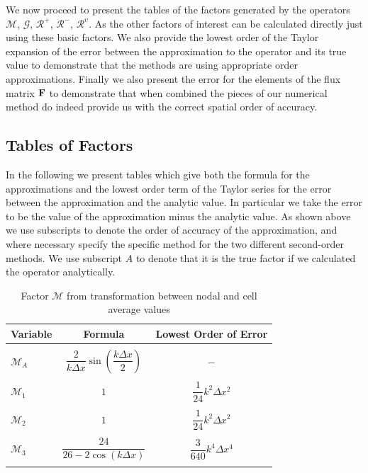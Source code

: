We now proceed to present the tables of the factors generated by the operators $\mathcal{M}$, $\mathcal{G}$, $\mathcal{R}^+$, $\mathcal{R}^-$, $\mathcal{R}^{\upsilon}$. As the other factors of interest can be calculated directly just using these basic factors. We also provide the lowest order of the Taylor expansion of the error between the approximation to the operator and its true value to demonstrate that the methods are using appropriate order approximations. Finally we also present the error for the elements of the flux matrix $\mathbf{F}$ to demonstrate that when combined the pieces of our numerical method do indeed provide us with the correct spatial order of accuracy.

\subsection{Tables of Factors}
In the following we present tables which give both the formula for the approximations and the lowest order term of the Taylor series for the error between the approximation and the analytic value. In particular we take the error to be the value of the approximation minus the analytic value. As shown above we use subscripts to denote the order of accuracy of the approximation, and where necessary specify the specific method for the two different second-order methods. We use subscript $A$ to denote that it is the true factor if we calculated the operator analytically.
\begin{table}
	\centering
	\begin{tabular}{l  c  c}
		Variable& Formula& Lowest Order of Error \\
		\hline && \\
		$\mathcal{M}_A$& $\dfrac{2}{k \Delta x } \sin\left(\dfrac{k\Delta x}{2}\right)$ & $-$ \\ & & \\
		$\mathcal{M}_1$& $1$ & $\dfrac{1}{24}k^2 \Delta x^2$ \\ & & \\
		$\mathcal{M}_2$& $1$ & $\dfrac{1}{24}k^2 \Delta x^2$ \\ & & \\
		$\mathcal{M}_3$& $\dfrac{24}{26 - 2 \cos\left(k \Delta x\right)}$ & $\dfrac{3}{640}k^4 \Delta x^4$ \\ & & \\
	\end{tabular}
	\caption{Factor $\mathcal{M}$ from transformation between nodal and cell average values}
	\label{tab:Mfactor}
\end{table}


